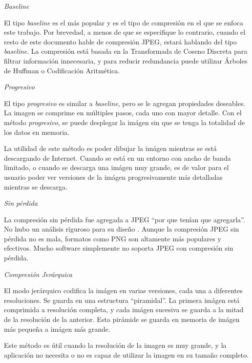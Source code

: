 \begin{list}{}{} \item \emph{Baseline}

El tipo \emph{\gls{baseline}} es el más popular y es el tipo de compresión en el que
se enfoca este trabajo. Por brevedad, a menos de que se especifique lo
contrario, cuando el resto de este documento hable de compresión JPEG, estará
hablando del tipo \emph{baseline}. La compresión está basada en la Transformada
de Coseno Discreta para filtrar información innecesaria, y para reducir
redundancia puede utilizar Árboles de Huffman o Codificación Aritmética.

\item \emph{Progresivo}

El tipo \emph{progresivo} es similar a \emph{baseline}, pero se le agregan
propiedades deseables. La imagen se comprime en múltiples pasos, cada uno con
mayor detalle. Con el método \emph{progresivo}, se puede desplegar la imágen
sin que se tenga la totalidad de los datos en memoria.

La utilidad de este método es poder dibujar la imágen mientras se está
descargando de Internet. Cuando se está en un entorno con ancho de banda
limitado, o cuando se descarga una imágen muy grande, es de valor para el
usuario poder ver versiones de la imágen progresivamente más detalladas
mientras se descarga.

\item \emph{Sin pérdida}

La compresión sin pérdida fue agregada a JPEG ``por que tenían que agregarla''.
No hubo un análisis riguroso para su diseño \cite{jpeg-spec}. Aunque la
compresión JPEG sin pérdida no es mala, formatos como PNG son altamente más
populares y efectivos. Mucho software simplemente no soporta JPEG con
compresión sin pérdida.

\item \emph{Compresión Jerárquica}

El modo jerárquico codifica la imágen en varias versiones, cada una a
diferentes resoluciones. Se guarda en una estructura ``piramidal''. La primera
imágen está comprimida a resolución completa, y cada imágen sucesiva se guarda
a la mitad de la resolución de la anterior. Esta pirámide se guarda en memoria
de imágen más pequeña a imágen más grande.

Este método es útil cuando la resolución de la imagen es muy grande, y la
aplicación no necesita o no es capaz de utilizar la imagen en su tamaño
completo.

\end{list}

